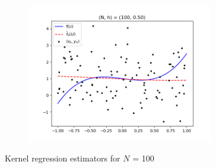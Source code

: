 \begin{figure}[h!]
\begin{subfigure}[h]{0.5\textwidth}
    \end{subfigure}%
    \begin{subfigure}[h]{0.5\textwidth}
        \centering
        \includegraphics[height=2.4in]{Figure_4.png}
    \end{subfigure}
    \caption{Kernel regression estimators for $N$ = 100}
\end{figure}
